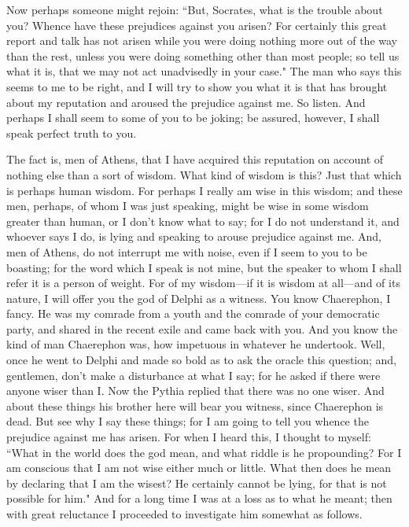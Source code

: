 \documentclass[letterpaper,12pt]{article}
\newcommand{\stephpag}[1]{\marginnote{\small\itshape\fontfamily{ppl}\selectfont #1}}
\begin{document}
Now perhaps someone might rejoin: ``But, Socrates, what is the trouble about you? Whence have these prejudices against you arisen? For certainly this great report and talk has not arisen while you were doing nothing more out of the way than the rest, unless you were doing something other than most people; so tell us \stephpag{d} what it is, that we may not act unadvisedly in your case." The man who says this seems to me to be right, and I will try to show you what it is that has brought about my reputation and aroused the prejudice against me. So listen. And perhaps I shall seem to some of you to be joking; be assured, however, I shall speak perfect truth to you.

The fact is, men of Athens, that I have acquired this reputation on account of nothing else than a sort of wisdom. What kind of wisdom is this? Just that which is perhaps human wisdom. For perhaps I really am wise in this wisdom; and these men, perhaps, \stephpag{e} of whom I was just speaking, might be wise in some wisdom greater than human, or I don't know what to say; for I do not understand it, and whoever says I do, is lying and speaking to arouse prejudice against me. And, men of Athens, do not interrupt me with noise, even if I seem to you to be boasting; for the word which I speak is not mine, but the speaker to whom I shall refer it is a person of weight. For of my wisdom---if it is wisdom at all---and of its nature, I will offer you the god of Delphi as a witness. You know Chaerephon, I fancy. \stephpag{21 a} He was my comrade from a youth and the comrade of your democratic party, and shared in the recent exile and came back with you. And you know the kind of man Chaerephon was, how impetuous in whatever he undertook. Well, once he went to Delphi and made so bold as to ask the oracle this question; and, gentlemen, don't make a disturbance at what I say; for he asked if there were anyone wiser than I. Now the Pythia replied that there was no one wiser. And about these things his brother here will bear you witness, since Chaerephon is dead. \stephpag{b} But see why I say these things; for I am going to tell you whence the prejudice against me has arisen. For when I heard this, I thought to myself: ``What in the world does the god mean, and what riddle is he propounding? For I am conscious that I am not wise either much or little. What then does he mean by declaring that I am the wisest? He certainly cannot be lying, for that is not possible for him." And for a long time I was at a loss as to what he meant; then with great reluctance I proceeded to investigate him somewhat as follows.
\end{document}
